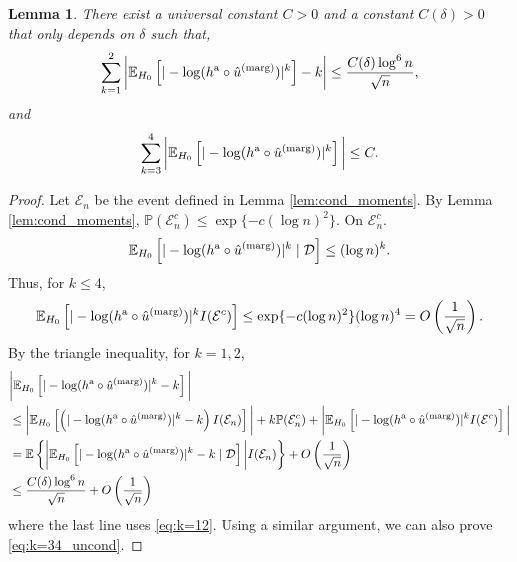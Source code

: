 \documentclass[11pt]{article}
\newtheorem{lemma}{Lemma}
\def\E{\mathbb{E}}
\def\marg{\textnormal{(marg)}}
\def\asym{\textnormal{a}}
\renewcommand{\P}{\mathbb{P}}
\newcommand{\D}{\mathcal{D}}
\newcommand{\event}{\mathcal{E}}
\newcommand{\lb}{\left(}
\newcommand{\rb}{\right)}
\begin{document}
\begin{lemma}\label{lem:uncond_moments}
  There exist a universal constant $C > 0$ and a constant $C(\delta) > 0$ that only depends on $\delta$ such that,
  \begin{equation}
    \label{eq:k=12_uncond}
    \sum_{k=1}^{2}\bigg|\E_{H_0}\left[|-\log (h^\asym \circ \hat{u}^\marg)|^k\right] - k\bigg| \le \frac{C(\delta)\log^6 n}{\sqrt{n}},
  \end{equation}
  and
  \begin{equation}
    \label{eq:k=34_uncond}
    \sum_{k=3}^{4}\bigg|\E_{H_0}\left[|-\log (h^\asym \circ \hat{u}^\marg)|^k\right]\bigg|\le C.
  \end{equation}

\end{lemma}
\begin{proof}
  Let $\event_n$ be the event defined in Lemma \ref{lem:cond_moments}. By Lemma \ref{lem:cond_moments}, $\P(\event_n^c) \le \exp\{-c(\log n)^2\}$. On $\event_n^c$.
  \[\E_{H_0}\left[|-\log (h^\asym \circ \hat{u}^\marg)|^k\mid \D\right]\le (\log n)^{k}.\]
  Thus, for $k\le 4$, 
  \[\E_{H_0}\left[|-\log (h^\asym \circ \hat{u}^\marg)|^k I(\event^c)\right]\le \exp\{-c(\log n)^2\}(\log n)^4 = O\lb\frac{1}{\sqrt{n}}\rb.\]
  By the triangle inequality, for $k = 1, 2$,
  \begin{align*}
    &\bigg|\E_{H_0}\left[|-\log (h^\asym \circ \hat{u}^\marg)|^k - k\right]\bigg|\\
    & \le \bigg|\E_{H_0}\left[\lb |-\log (h^\asym \circ \hat{u}^\marg)|^k - k\rb I(\event_n)\right]\bigg| + k\P(\event_n^c) + \bigg|\E_{H_0}\left[|-\log (h^\asym \circ \hat{u}^\marg)|^k I(\event^c)\right]\bigg|\\
    & = \E\left\{\bigg|\E_{H_0}\left[|-\log (h^\asym \circ \hat{u}^\marg)|^k - k\mid \D\right]\bigg|I(\event_n)\right\} + O\lb\frac{1}{\sqrt{n}}\rb\\
    & \le \frac{C(\delta)\log^6 n}{\sqrt{n}} + O\lb\frac{1}{\sqrt{n}}\rb
  \end{align*}
  where the last line uses \eqref{eq:k=12}. Using a similar argument, we can also prove \eqref{eq:k=34_uncond}.
\end{proof}
\end{document}
